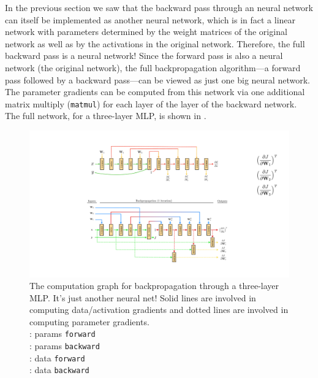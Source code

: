 In the previous section we saw that the backward pass through an neural network can itself be implemented as another neural network, which is in fact a linear network with parameters determined by the weight matrices of the original network as well as by the activations in the original network. Therefore, the full backward pass is a neural network! Since the forward pass is also a neural network (the original network), the full backpropagation algorithm—a forward pass followed by a backward pass—can be viewed as just one big neural network. The parameter gradients can be computed from this network via one additional matrix multiply (\texttt{matmul}) for each layer of the layer of the backward network. The full network, for a three-layer MLP, is shown in \fig{\ref{fig:backpropagation:backprop_as_neural_net}}.
\begin{figure}[h!]
    \centerline{
    \includegraphics[width=1.0\linewidth]{./figures/backpropagation/backprop_as_neural_net.pdf}
    }
    \caption{The computation graph for backpropagation through a three-layer MLP. It's just another neural net! Solid lines are involved in computing data/activation gradients and dotted lines are involved in computing parameter gradients.\\ \hfill \break\raisebox{0.5mm}{\textcolor{comp_graph_param_bcolor}{\rule{4mm}{2pt}}} : params \texttt{forward}\\\raisebox{0.5mm}{\textcolor{backwardpropcolor_params}{\rule{4mm}{2pt}}} : params \texttt{backward}\\\raisebox{0.5mm}{\textcolor{forwardpropcolor}{\rule{4mm}{2pt}}} : data \texttt{forward}\\\raisebox{0.5mm}{\textcolor{backwardpropcolor}{\rule{4mm}{2pt}}} : data \texttt{backward}}
    \label{fig:backpropagation:backprop_as_neural_net}
\end{figure}

